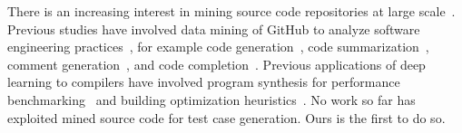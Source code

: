 There is an increasing interest in mining source code repositories at large scale~\cite{Allamanis2013a,White2015a,Bird2009}. Previous studies have involved data mining of GitHub to analyze software engineering practices~\cite{Wu2014,Guzman2014,Baishakhi2014a,Vasilescu2015}, for example code generation~\cite{Zhang2015a}, code summarization~\cite{Allamanis2016}, comment generation~\cite{Wong2013}, and code completion~\cite{Raychev2014}. Previous applications of deep learning to compilers have involved program synthesis for performance benchmarking~\cite{Cummins2017a} and building optimization heuristics~\cite{Cummins2017b}. No work so far has exploited mined source code for test case generation. Ours is the first to do so.

